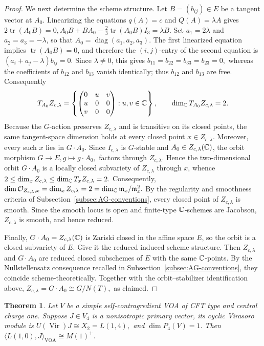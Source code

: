 \documentclass[10pt,a4paper]{amsart}
\numberwithin{equation}{section} \newtheorem{thm}{Theorem}[section] \newtheorem{lem}[thm]{Lemma} \newtheorem{ex}[thm]{Example} \newtheorem{prop}[thm]{Proposition} \newtheorem{cor}[thm]{Corollary} \newtheorem{defi}[thm]{Definition} \newtheorem{rmk}[thm]{Remark} \newtheorem{notation}[thm]{Notation}
\newcommand{\Vir}{\operatorname{Vir}}
\begin{document}
\begin{proof}
We next determine the scheme structure. Let $B=(b_{ij})\in E$ be a tangent vector at $A_0$. Linearizing the equations $q(A)=c$ and $Q(A)=\lambda A$ gives \(2\operatorname{tr}(A_0B)=0,A_0B+BA_0-\frac23\operatorname{tr}(A_0B)I_3=\lambda B.\) Set $a_1=2\lambda$ and $a_2=a_3=-\lambda$, so that $A_0=\operatorname{diag}(a_1,a_2,a_3)$. The first linearized equation implies $\operatorname{tr}(A_0B)=0$, and therefore the $(i,j)$-entry of the second equation is \((a_i+a_j-\lambda)b_{ij}=0.\) Since $\lambda\ne0$, this gives \(b_{11}=b_{22}=b_{33}=b_{23}=0,\) whereas the coefficients of $b_{12}$ and $b_{13}$ vanish identically; thus $b_{12}$ and $b_{13}$ are free. Consequently
\[
T_{A_0}Z_{c,\lambda}
=
\left\{
\begin{pmatrix}
0&u&v\\
u&0&0\\
v&0&0
\end{pmatrix}
:u,v\in\mathbb{C}
\right\},
\qquad
\dim_{\mathbb{C}} T_{A_0}Z_{c,\lambda}=2.
\]
Because the $G$-action preserves $Z_{c,\lambda}$ and is transitive on its closed points, the same tangent-space dimension holds at every closed point $x\in Z_{c,\lambda}$. Moreover, every such $x$ lies in $G\cdot A_0$. Since $I_{c,\lambda}$ is $G$-stable and $A_0\in Z_{c,\lambda}(\mathbb{C})$, the orbit morphism \(G\longrightarrow E,g\longmapsto g\cdot A_0,\) factors through $Z_{c,\lambda}$. Hence the two-dimensional orbit $G\cdot A_0$ is a locally closed subvariety of $Z_{c,\lambda}$ through $x$, whence \(2\leq\dim_x Z_{c,\lambda}\leq\dim_{\mathbb{C}} T_xZ_{c,\lambda}=2.\) Consequently, \(\dim\mathcal O_{Z_{c,\lambda},x}=\dim_x Z_{c,\lambda}=2=\dim_{\mathbb{C}}\mathfrak m_x/\mathfrak m_x^2.\) By the regularity and smoothness criteria of Subsection~\ref{subsec:AG-conventions}, every closed point of $Z_{c,\lambda}$ is smooth. Since the smooth locus is open and finite-type $\mathbb{C}$-schemes are Jacobson, $Z_{c,\lambda}$ is smooth, and hence reduced.

Finally, $ G\cdot A_0=Z_{c,\lambda}(\mathbb{C}) $ is Zariski closed in the affine space \(E\), so the orbit is a closed subvariety of \(E\). Give it the reduced induced scheme structure. Then \(Z_{c,\lambda}\) and \(G\cdot A_0\) are reduced closed subschemes of \(E\) with the same \(\mathbb{C}\)-points. By the Nullstellensatz consequence recalled in Subsection~\ref{subsec:AG-conventions}, they coincide scheme-theoretically. Together with the orbit--stabilizer identification above, $ Z_{c,\lambda}=G\cdot A_0\cong G/N(T), $ as claimed.
\end{proof}

\begin{thm}\label{thm:M1plus-core}
Let $V$ be a simple self-contragredient VOA of CFT type and central charge one. Suppose $J\in V_4$ is a nonisotropic primary vector, its cyclic Virasoro module is \(U(\Vir)J\cong X_2=L(1,4),\) and \(\dim P_4(V)=1.\) Then \(\langle L(1,0),J\rangle_{\mathrm{VOA}}\cong M(1)^+.\)
\end{thm}
\end{document}
